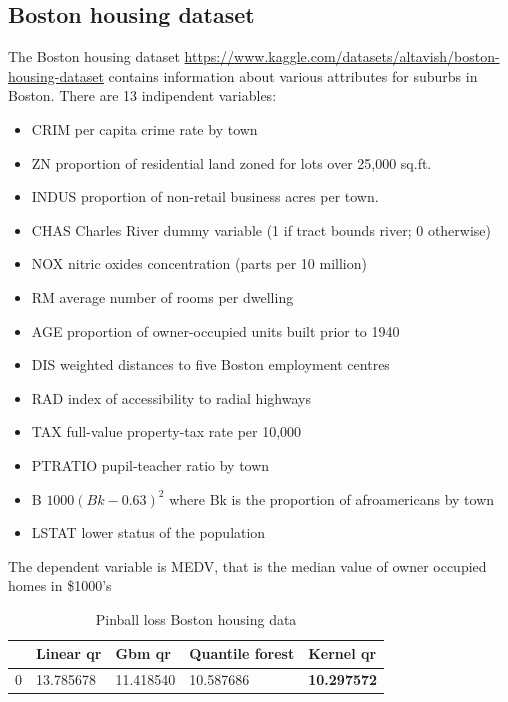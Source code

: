 \subsection{Boston housing dataset}
The Boston housing dataset \href{https://www.kaggle.com/datasets/altavish/boston-housing-dataset}{https://www.kaggle.com/datasets/altavish/boston-housing-dataset} contains information about various attributes for suburbs in Boston.
There are 13 indipendent variables:
\begin{itemize}
\item CRIM per capita crime rate by town
\item ZN proportion of residential land zoned for lots over 25,000 sq.ft.
\item INDUS proportion of non-retail business acres per town.
\item CHAS Charles River dummy variable (1 if tract bounds river; 0 otherwise)
\item NOX nitric oxides concentration (parts per 10 million)
\item RM average number of rooms per dwelling
\item AGE proportion of owner-occupied units built prior to 1940
\item DIS weighted distances to five Boston employment centres
\item RAD index of accessibility to radial highways
\item TAX full-value property-tax rate per 10,000
\item PTRATIO pupil-teacher ratio by town
\item B $1000(Bk - 0.63)^2$ where Bk is the proportion of afroamericans by town
\item LSTAT lower status of the population
\end{itemize}
The dependent variable is MEDV, that is the median value of owner occupied homes in \$1000's

\begin{table}
\caption{Pinball loss Boston housing data}
\begin{tabular}{lllll}
\toprule
    & Linear qr & Gbm qr & Quantile forest & Kernel qr \\
\midrule
0 & 13.785678 & 11.418540 & 10.587686 & \textbf{10.297572} \\
\bottomrule
\end{tabular}
\end{table}

